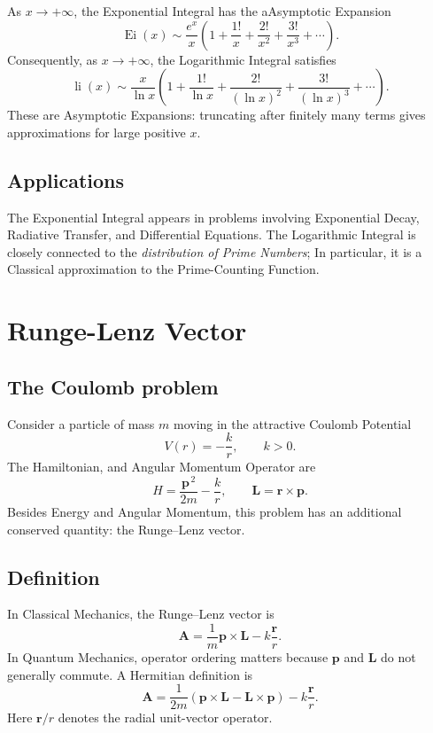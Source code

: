 \documentclass[a4paper, 10pt, onepage]{elegantbook}
\begin{document}
{As \(x\to+\infty\), the Exponential Integral has the aAsymptotic Expansion
\[
\operatorname{Ei}(x)
\sim \frac{e^x}{x}
\left(
1+\frac{1!}{x}+\frac{2!}{x^2}
+\frac{3!}{x^3}+\cdots
\right).
\]
Consequently, as \(x\to+\infty\), the Logarithmic Integral satisfies
\[
\operatorname{li}(x)
\sim \frac{x}{\ln x}
\left(
1+\frac{1!}{\ln x}+\frac{2!}{(\ln x)^2}
+\frac{3!}{(\ln x)^3}+\cdots
\right).
\]
These are Asymptotic Expansions: truncating after finitely many terms gives approximations for large positive \(x\).

\subsection{Applications}

The Exponential Integral appears in problems involving Exponential Decay, Radiative Transfer, and Differential 
Equations. The Logarithmic Integral is closely connected to the \emph{distribution of Prime Numbers}; In particular, it 
is a Classical approximation to the Prime-Counting Function.

\section{Runge-Lenz Vector}

\subsection{The Coulomb problem}

Consider a particle of mass \(m\) moving in the attractive Coulomb
Potential
\[
V(r)=-\frac{k}{r},\qquad k>0.
\]
The Hamiltonian, and Angular Momentum Operator are
\[
H=\frac{\mathbf{p}^{\,2}}{2m}-\frac{k}{r},
\qquad
\mathbf{L}=\mathbf{r}\times\mathbf{p}.
\]
Besides Energy and Angular Momentum, this problem has an additional
conserved quantity: the Runge--Lenz vector.

\subsection{Definition}

In Classical Mechanics, the Runge--Lenz vector is
\[
\mathbf{A}
=\frac{1}{m}\mathbf{p}\times\mathbf{L}
-k\frac{\mathbf{r}}{r}.
\]
In Quantum Mechanics, operator ordering matters because
\(\mathbf{p}\) and \(\mathbf{L}\) do not generally commute. A Hermitian
definition is
\[
\boxed{
\mathbf{A}
=\frac{1}{2m}
\left(\mathbf{p}\times\mathbf{L}
      -\mathbf{L}\times\mathbf{p}\right)
-k\frac{\mathbf{r}}{r}
}.
\]
Here \(\mathbf{r}/r\) denotes the radial unit-vector operator.

}
\end{document}
